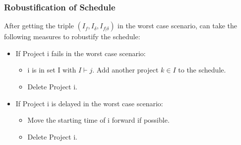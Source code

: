 \documentclass{beamer}
\begin{document}
\begin{frame}
\frametitle{Robustification of Schedule}
After getting the triple $(I_f, I_{\delta}, I_{f|\delta})$ in the worst case scenario, can take the following measures to robustify the schedule:
\bigskip
\begin{itemize}
\item If Project i fails in the worst case scenario:
\medskip
	\begin{itemize}
		\item i is  in set I with $I\vdash j$. Add another project $k\in I$ to the schedule. 
\medskip
		\item Delete Project i. 
\medskip
	\end{itemize}
	\item If Project i is delayed in the worst case scenario:
\medskip
	\begin{itemize}
		\item Move the starting time of i forward if possible.
\medskip
		\item Delete Project i. 
	\end{itemize}
\end{itemize}
\end{frame}
\end{document}
